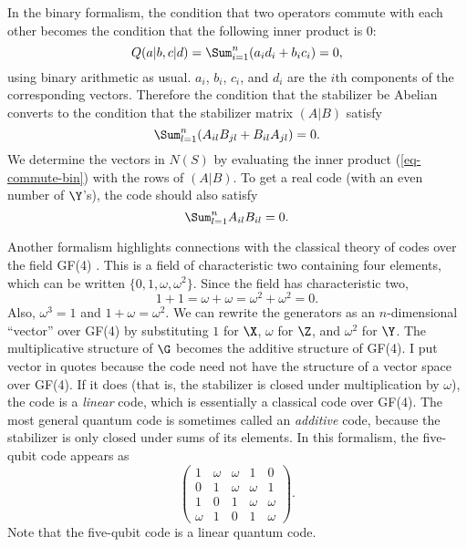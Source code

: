 In the binary formalism, the condition that two operators commute with
each other becomes the condition that the following inner product is 0:
\begin{equation}
	Q(a|b, c|d) = \Sum_{i=1}^n (a_{i} d_{i} + b_{i} c_{i}) = 0,
	\label{eq-commute-bin}
\end{equation}
using binary arithmetic as usual.  $a_i$, $b_i$, $c_i$, and $d_i$ are the
$i$th components of the corresponding vectors.    Therefore the condition
that the stabilizer be Abelian converts to the condition that the stabilizer
matrix $(A|B)$ satisfy
\begin{equation}
	\Sum_{l=1}^n (A_{il} B_{jl} + B_{il} A_{jl}) = 0.
\end{equation}
We determine the vectors in $N(S)$ by evaluating the inner product
(\ref{eq-commute-bin}) with the rows of $(A|B)$.  To get a real code (with
an even number of $\Y$'s), the code should also satisfy
\begin{equation}
	\Sum_{l=1}^n A_{il} B_{il} = 0.
\end{equation}

Another formalism highlights connections with the classical theory of codes
over the field GF(4) \cite{calderbank-GF4}.  This is a field of characteristic
two containing four elements, which can be written
$\{0, 1, \omega, \omega^2\}$.  Since the field has characteristic two,
\begin{equation}
	1 + 1 = \omega + \omega = \omega^2 + \omega^2 = 0.
\end{equation}
Also, $\omega^3 = 1$ and $1 + \omega = \omega^2$.  We can rewrite the
generators as an $n$-dimensional ``vector'' over GF(4) by substituting $1$
for $\X$, $\omega$ for $\Z$, and $\omega^2$ for $\Y$.  The multiplicative
structure of $\G$ becomes the additive structure of GF(4).  I put vector in
quotes because the code need not have the structure of a vector space over
GF(4).  If it does (that is, the stabilizer is closed under multiplication by
$\omega$), the code is a {\em linear} code, which is essentially a classical
code over GF(4).  The most general quantum code is sometimes called an {\em
additive} code, because the stabilizer is only closed under sums of its elements.  In this formalism, the five-qubit code appears as
\begin{equation}
	\left( \begin{array}{ccccc}
		       1 & \omega & \omega & 1 & 0 \\
		       0 & 1 & \omega & \omega & 1 \\
		       1 & 0 & 1 & \omega & \omega \\
		       \omega & 1 & 0 & 1 & \omega
	\end{array} \right).
\end{equation}
Note that the five-qubit code is a linear quantum code.


